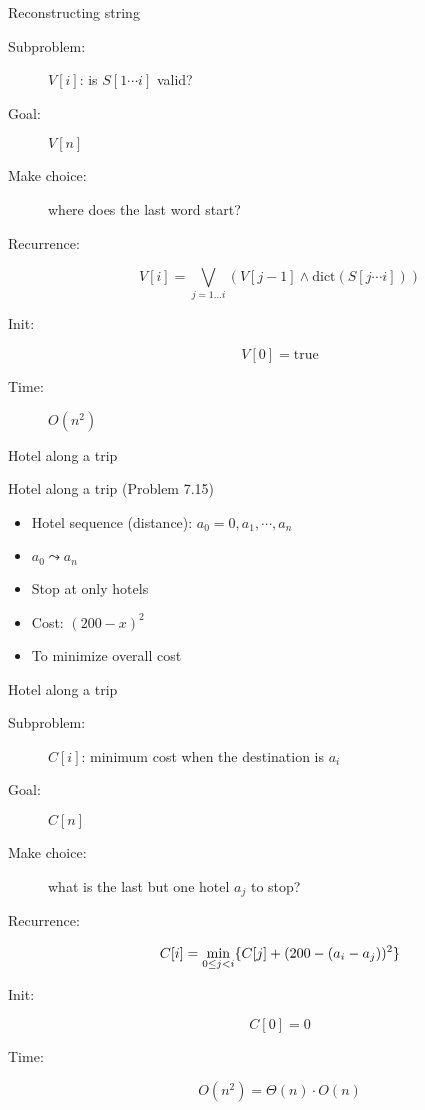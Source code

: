 \begin{frame}{Reconstructing string}
  \begin{description}
	\item[Subproblem:] $V[i]$: is $S[1 \cdots i]$ valid?
	\item[Goal:] $V[n]$
	\pause
	\item[Make choice:] where does the last word start?
	\item[Recurrence:] 
	  \[ 
		V[i] = \bigvee_{j = 1 \ldots i} (V[j-1] \land \text{dict}(S[j \cdots i]))
	  \]
	\pause
	\item[Init:]
	  \[
		V[0] = \text{true}
	  \]
	\item[Time:] $O(n^2)$
  \end{description}
\end{frame}
\begin{frame}{Hotel along a trip}
  \begin{exampleblock}{Hotel along a trip (Problem 7.15)}
    \begin{itemize}
      \item Hotel sequence (distance): $a_{0} = 0, a_{1}, \cdots, a_{n}$
      \item $a_0 \leadsto a_n$ 
	  \item Stop at only hotels
      \item Cost: $(200 - x)^{2}$ 
      \item To minimize overall cost
    \end{itemize}
  \end{exampleblock}
\end{frame}
\begin{frame}{Hotel along a trip}
  \begin{description}
	\item[Subproblem:] $C[i]$: minimum cost when the destination is $a_{i}$
	\item[Goal:] $C[n]$
	\pause
	\item[Make choice:] what is the last but one hotel $a_{j}$ to stop?
	\item[Recurrence:] 
	  \[
		C[i] = \min_{0 \le j < i} \{C[j] + (200 - (a_{i} - a_{j}))^{2}\}
	  \]
	\pause
	\item[Init:]
	  \[
		C[0] = 0
	  \]
	\item[Time:] 
	  \[
		O(n^2) = \Theta(n) \cdot O(n)
	  \]
  \end{description}
\end{frame}

